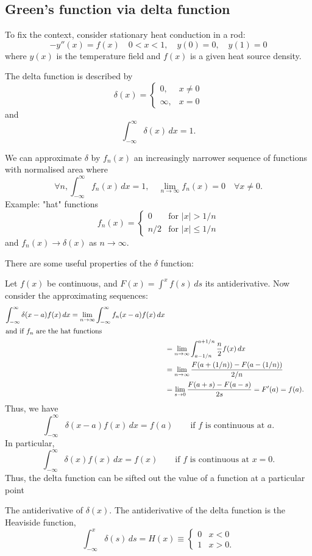\documentclass[10pt, a4paper]{article}
\begin{document}
\subsection{Green's function via delta function}

To fix the context,
consider stationary heat conduction in a rod:
\[
-y''(x) = f(x)\quad 0 < x < 1,\quad y(0) = 0,\quad y(1) = 0
\]
where $y(x)$ is the temperature field and $f(x)$ is a given heat source density.

The delta function is described by
\[
\delta(x) = \begin{cases}
    0, & x \neq 0 \\
    \infty, & x = 0
\end{cases}
\]
and
\[
\int_{-\infty}^{\infty}\delta(x)\,dx = 1.
\]

We can approximate $\delta$ by $f_n(x)$ an increasingly narrower sequence of functions with normalised area where
\[
\forall n, \int_{-\infty}^{\infty}f_n(x)\,dx = 1,\quad \lim_{n \to \infty}f_n(x) = 0\quad \forall x \neq 0.
\]
Example:
"hat"
functions
\[
f_n(x) = \begin{cases}
    0 &\text{for } |x| > 1 / n \\
    n / 2 &\text{for } |x| \leq 1 / n
\end{cases}
\]
and $f_n(x) \to \delta(x)$ as $n \to \infty$.

There are some useful properties of the $\delta$ function:

Let $f(x)$ be continuous,
and $F(x) = \int^{x}f(s)\,ds$ its antiderivative.
Now consider the approximating sequences:
\begin{align*}
    \int_{-\infty}^{\infty}\delta(x - a)f(x)\,dx = \lim_{n \to \infty}\int_{-\infty}^{\infty}f_n(x - a)f(x)\,dx \\
    \intertext{and if $f_n$ are the hat functions}
    &= \lim_{n \to \infty}\int_{a - 1 / n}^{a + 1 / n}\frac{n}{2}f(x)\,dx \\
    &= \lim_{n \to \infty}\frac{F(a + (1 / n)) - F(a - (1 / n))}{2 / n} \\
    &= \lim_{s \to 0}\frac{F(a + s) - F(a - s)}{2s} = F'(a) = f(a).
\end{align*}
Thus,
we have
\[
\int_{-\infty}^{\infty}\delta(x - a)f(x)\,dx = f(a)\qquad\text{if $f$ is continuous at $a$}.
\]
In particular,
\[
\int_{-\infty}^{\infty}\delta(x)f(x)\,dx = f(x)\qquad\text{if $f$ is continuous at $x = 0$}.
\]
Thus,
the delta function can be sifted out the value of a function at a particular point

The antiderivative of $\delta(x)$.
The antiderivative of the delta function is the Heaviside function,
\[
\int_{-\infty}^{x}\delta(s)\,ds = H(x) \equiv \begin{cases}
    0 & x < 0 \\
    1 & x > 0.
\end{cases}
\]
\end{document}
